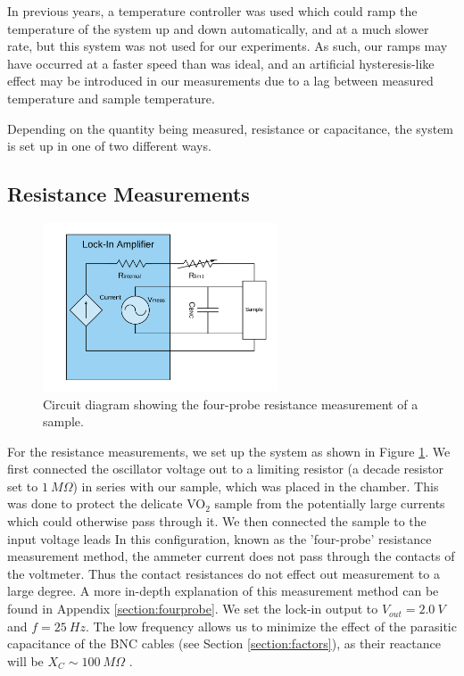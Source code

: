 \documentclass[%
 reprint,
 amsmath,amssymb,
 aps,
 pra,
]{revtex4-1}
\begin{document}
In previous years, a temperature controller was used which could ramp the temperature of the system up and down automatically, and at a much slower rate, but this system was not used for our experiments. As such, our ramps may have occurred at a faster speed than was ideal, and an artificial hysteresis-like effect may be introduced in our measurements due to a lag between measured temperature and sample temperature. 

Depending on the quantity being measured, resistance or capacitance, the system is set up in one of two different ways.

\subsection{Resistance Measurements}\label{rmeas}

\begin{figure}[H]
	\centering
	\includegraphics[height=5cm]{diagram_res.png}
	\caption{Circuit diagram showing the four-probe resistance measurement of a sample.}
	\label{fig:ResistanceMeasurements}
\end{figure}

For the resistance measurements, we set up the system as shown in Figure \ref{fig:ResistanceMeasurements}. We first connected the oscillator voltage out to a limiting resistor (a decade resistor set to $1~M\Omega$) in series with our sample, which was placed in the chamber. This was done to protect the delicate VO$_2$ sample from the potentially large currents which could otherwise pass through it. We then connected the sample to the input voltage leads In this configuration, known as the 'four-probe' resistance measurement method, the ammeter current does not pass through the contacts of the voltmeter. Thus the contact resistances do not effect out measurement to a large degree. A more in-depth explanation of this measurement method can be found in Appendix \ref{section:fourprobe}. We set the lock-in output to $V_{out} = 2.0~V$ and $f = 25~Hz$. The low frequency allows us to minimize the effect of the parasitic capacitance of the BNC cables (see Section \ref{section:factors}), as their reactance will be $X_C \sim 100~M\Omega$ \cite{manual}.
\end{document}
